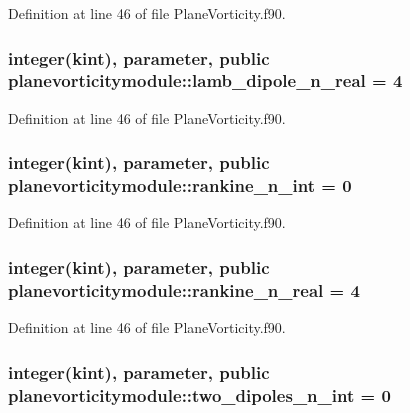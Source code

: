 Definition at line 46 of file Plane\+Vorticity.\+f90.

\hypertarget{classplanevorticitymodule_aa6d6634dd07803ab07d05ca7b8545536}{
\subsubsection[{lamb\+\_\+dipole\+\_\+n\+\_\+real}]{\setlength{\rightskip}{0pt plus 5cm}integer(kint), parameter, public planevorticitymodule\+::lamb\+\_\+dipole\+\_\+n\+\_\+real = 4}}\label{classplanevorticitymodule_aa6d6634dd07803ab07d05ca7b8545536}


Definition at line 46 of file Plane\+Vorticity.\+f90.

\hypertarget{classplanevorticitymodule_ae046028c791f2a4c56667abc8f962a03}{
\subsubsection[{rankine\+\_\+n\+\_\+int}]{\setlength{\rightskip}{0pt plus 5cm}integer(kint), parameter, public planevorticitymodule\+::rankine\+\_\+n\+\_\+int = 0}}\label{classplanevorticitymodule_ae046028c791f2a4c56667abc8f962a03}


Definition at line 46 of file Plane\+Vorticity.\+f90.

\hypertarget{classplanevorticitymodule_a69fc6e3c83e0b264e371f5449f32d7e3}{
\subsubsection[{rankine\+\_\+n\+\_\+real}]{\setlength{\rightskip}{0pt plus 5cm}integer(kint), parameter, public planevorticitymodule\+::rankine\+\_\+n\+\_\+real = 4}}\label{classplanevorticitymodule_a69fc6e3c83e0b264e371f5449f32d7e3}


Definition at line 46 of file Plane\+Vorticity.\+f90.

\hypertarget{classplanevorticitymodule_ab0fb928966a7599273db79fbfded8257}{
\subsubsection[{two\+\_\+dipoles\+\_\+n\+\_\+int}]{\setlength{\rightskip}{0pt plus 5cm}integer(kint), parameter, public planevorticitymodule\+::two\+\_\+dipoles\+\_\+n\+\_\+int = 0}}\label{classplanevorticitymodule_ab0fb928966a7599273db79fbfded8257}


